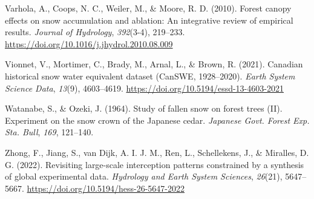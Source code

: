 \documentclass[
  letterpaper,
  DIV=11,
  numbers=noendperiod]{scrartcl}
\newlength{\cslhangindent}
\newenvironment{CSLReferences}[2] %
 {\begin{list}{}{%
  \setlength{\itemindent}{0pt}
  \setlength{\leftmargin}{0pt}
  \setlength{\parsep}{0pt}
  \ifodd #1
   \setlength{\leftmargin}{\cslhangindent}
   \setlength{\itemindent}{-1\cslhangindent}
  \fi
  \setlength{\itemsep}{#2\baselineskip}}}
 {\end{list}}
\begin{document}
\begin{CSLReferences}{1}{0}
Varhola, A., Coops, N. C., Weiler, M., \& Moore, R. D. (2010). Forest
canopy effects on snow accumulation and ablation: {An} integrative
review of empirical results. \emph{Journal of Hydrology},
\emph{392}(3-4), 219--233.
\url{https://doi.org/10.1016/j.jhydrol.2010.08.009}

Vionnet, V., Mortimer, C., Brady, M., Arnal, L., \& Brown, R. (2021).
Canadian historical snow water equivalent dataset ({CanSWE},
1928--2020). \emph{Earth System Science Data}, \emph{13}(9), 4603--4619.
\url{https://doi.org/10.5194/essd-13-4603-2021}

Watanabe, S., \& Ozeki, J. (1964). Study of fallen snow on forest trees
({II}). {Experiment} on the snow crown of the {Japanese} cedar.
\emph{Japanese Govt. Forest Exp. Sta. Bull}, \emph{169}, 121--140.

Zhong, F., Jiang, S., van Dijk, A. I. J. M., Ren, L., Schellekens, J.,
\& Miralles, D. G. (2022). Revisiting large-scale interception patterns
constrained by a synthesis of global experimental data. \emph{Hydrology
and Earth System Sciences}, \emph{26}(21), 5647--5667.
\url{https://doi.org/10.5194/hess-26-5647-2022}

\end{CSLReferences}
\end{document}
